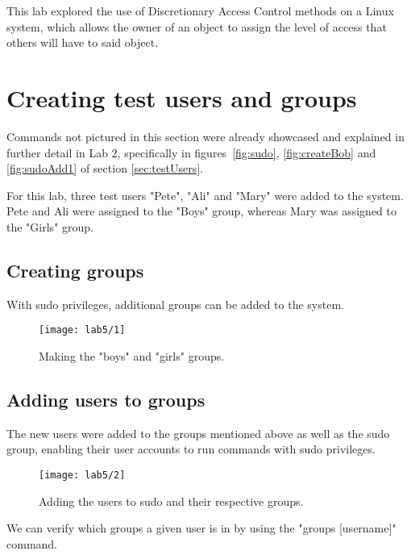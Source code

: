 This lab explored the use of Discretionary Access Control methods on a Linux system, which allows
the owner of an object to assign the level of access that others will have to said object.

\section{Creating test users and groups}\label{sec:creating-test-users}

\begin{tcolorbox}[colback=orange!5!white,colframe=orange!75!black,title=Note]
    Commands not pictured in this section were already showcased and explained in
    further detail in Lab 2, specifically in figures~\ref{fig:sudo}, \ref{fig:createBob}
    and \ref{fig:sudoAdd1} of section \ref{sec:testUsers}.
\end{tcolorbox}

\noindent For this lab, three test users "Pete", "Ali" and "Mary" were added to the system.
Pete and Ali were assigned to the "Boys" group, whereas Mary was assigned to the "Girls" group.

\subsection{Creating groups}\label{subsec:creating-groups}
With sudo privileges, additional groups can be added to the system.

\begin{figure}[H]
    \centering
    \texttt{[image: lab5/1]}
    \caption{Making the "boys" and "girls" groups.}
    \label{fig:addgroup}
\end{figure}

\subsection{Adding users to groups}\label{subsec:adding-users-to-groups}

The new users were added to the groups mentioned above as well as the sudo group, enabling
their user accounts to run commands with sudo privileges.

\begin{figure}[H]
    \centering
    \texttt{[image: lab5/2]}
    \caption{Adding the users to sudo and their respective groups.}
    \label{fig:addToGroup}
\end{figure}

We can verify which groups a given user is in by using the "groups [username]" command.

